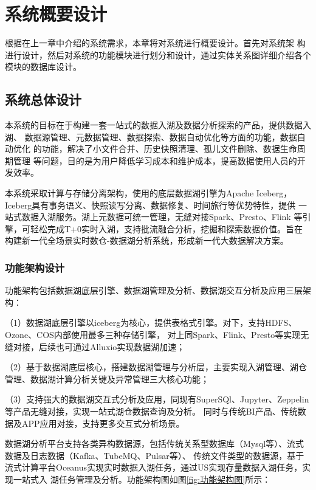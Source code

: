 
\chapter{系统概要设计}

根据在上一章中介绍的系统需求，本章将对系统进行概要设计。首先对系统架
构进行设计，然后对系统的功能模块进行划分和设计，通过实体关系图详细介绍各个模块的数据库设计。

\section{系统总体设计}

本系统的目标在于构建一套一站式的数据入湖及数据分析探索的产品，提供数据入湖、
数据源管理、元数据管理、数据探索、数据自动优化等方面的功能，数据自动优化
的功能，解决了小文件合并、历史快照清理、孤儿文件删除、数据生命周期管理
等问题，目的是为用户降低学习成本和维护成本，提高数据使用人员的开发效率。

本系统采取计算与存储分离架构，使用的底层数据湖引擎为Apache Iceberg，
Iceberg具有事务语义、快照读写分离、数据修复、时间旅行等优势特性，提供
一站式数据入湖服务。湖上元数据可统一管理，无缝对接Spark、Presto、Flink
等引擎，可轻松完成T+0实时入湖，支持批流融合分析，挖掘和探索数据价值。旨在
构建新一代全场景实时数仓-数据湖分析系统，形成新一代大数据解决方案。

\subsection{功能架构设计}

功能架构包括数据湖底层引擎、数据湖管理及分析、数据湖交互分析及应用三层架构：

（1）数据湖底层引擎以iceberg为核心，提供表格式引擎。对下，支持HDFS、Ozone、COS内部使用最多三种存储引擎，
对上同Spark、Flink、Presto等实现无缝对接，后续也可通过Alluxio实现数据湖加速；

（2）基于数据湖底层核心，搭建数据湖管理与分析层，主要实现入湖管理、湖仓管理、数据湖计算分析关键及异常管理三大核心功能；

（3）支持强大的数据湖交互式分析及应用，同现有SuperSQl、Jupyter、Zeppelin等产品无缝对接，实现一站式湖仓数据查询及分析。
同时与传统BI产品、传统数据及APP应用对接，支持更多交互式分析场景。

数据湖分析平台支持各类异构数据源，包括传统关系型数据库（Mysql等）、流式数据及日志数据（Kafka、TubeMQ、Pulsar等）、
传统文件类型的数据源，基于流式计算平台Oceanus实现实时数据入湖任务，通过US实现存量数据入湖任务，实现一站式入
湖任务管理及分析。功能架构图如图\ref{fig:功能架构图}所示：

